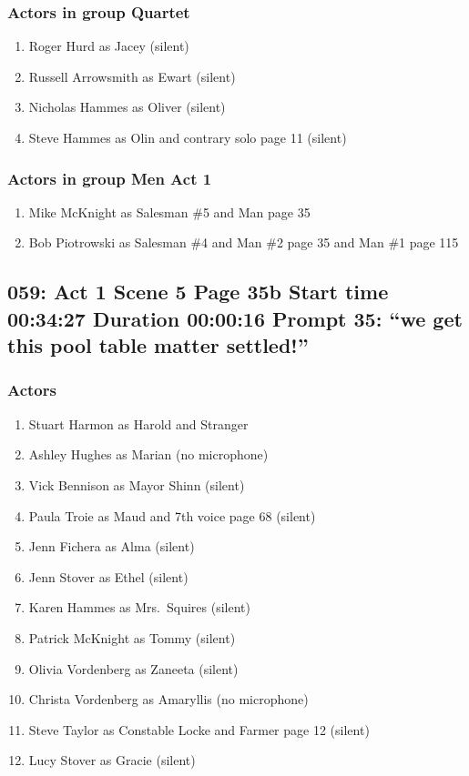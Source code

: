 \subsubsection{Actors in group Quartet}
\begin{enumerate}
\item Roger Hurd as Jacey (silent)
\item Russell Arrowsmith as Ewart (silent)
\item Nicholas Hammes as Oliver (silent)
\item Steve Hammes as Olin and contrary solo page 11 (silent)
\end{enumerate}
\subsubsection{Actors in group Men Act 1}
\begin{enumerate}
\item Mike McKnight as Salesman \#5 and Man page 35
\item Bob Piotrowski as Salesman \#4 and Man \#2 page 35 and Man \#1 page 115
\end{enumerate}


\subsection{059: Act 1 Scene 5 Page 35b Start time 00:34:27 Duration 00:00:16 Prompt 35: ``we get this pool table matter settled!''}

\subsubsection{Actors}
\begin{enumerate}
\item Stuart Harmon as Harold and Stranger
\item Ashley Hughes as Marian (no microphone)
\item Vick Bennison as Mayor Shinn (silent)
\item Paula Troie as Maud and 7th voice page 68 (silent)
\item Jenn Fichera as Alma (silent)
\item Jenn Stover as Ethel (silent)
\item Karen Hammes as Mrs.~Squires (silent)
\item Patrick McKnight as Tommy (silent)
\item Olivia Vordenberg as Zaneeta (silent)
\item Christa Vordenberg as Amaryllis (no microphone)
\item Steve Taylor as Constable Locke and Farmer page 12 (silent)
\item Lucy Stover as Gracie (silent)
\end{enumerate}
